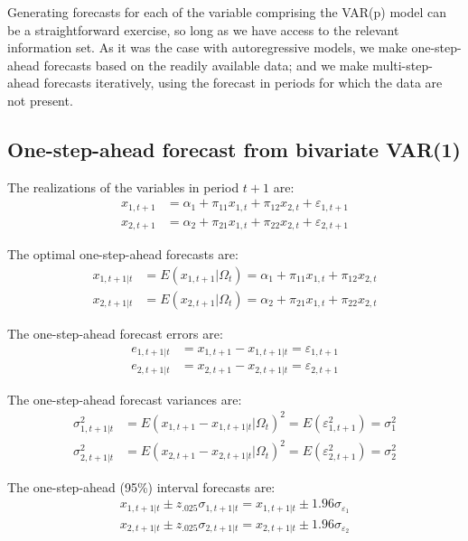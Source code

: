 \documentclass[
  oneside]{book}
\begin{document}
Generating forecasts for each of the variable comprising the VAR(p) model can be a straightforward exercise, so long as we have access to the relevant information set. As it was the case with autoregressive models, we make one-step-ahead forecasts based on the readily available data; and we make multi-step-ahead forecasts iteratively, using the forecast in periods for which the data are not present.

\hypertarget{one-step-ahead-forecast-from-bivariate-var1}{%
\subsection{One-step-ahead forecast from bivariate VAR(1)}\label{one-step-ahead-forecast-from-bivariate-var1}}

The realizations of the variables in period \(t+1\) are:
\[\begin{aligned}
x_{1,t+1} &= \alpha_1 + \pi_{11} x_{1,t} + \pi_{12} x_{2,t} + \varepsilon_{1,t+1} \\
x_{2,t+1} &= \alpha_2 + \pi_{21} x_{1,t} + \pi_{22} x_{2,t} + \varepsilon_{2,t+1}
\end{aligned}\]

The optimal one-step-ahead forecasts are:
\[\begin{aligned}
x_{1,t+1|t} &= E(x_{1,t+1}|\Omega_t) = \alpha_1 + \pi_{11} x_{1,t} + \pi_{12} x_{2,t} \\
x_{2,t+1|t} &= E(x_{2,t+1}|\Omega_t) = \alpha_2 + \pi_{21} x_{1,t} + \pi_{22} x_{2,t}
\end{aligned}\]

The one-step-ahead forecast errors are:
\[\begin{aligned}
e_{1,t+1|t} &= x_{1,t+1} - x_{1,t+1|t} = \varepsilon_{1,t+1} \\
e_{2,t+1|t} &= x_{2,t+1} - x_{2,t+1|t} = \varepsilon_{2,t+1}
\end{aligned}\]

The one-step-ahead forecast variances are:
\[\begin{aligned}
\sigma_{1,t+1|t}^2 &= E(x_{1,t+1} - x_{1,t+1|t}|\Omega_t)^2 = E(\varepsilon_{1,t+1}^2) = \sigma_{1}^2 \\
\sigma_{2,t+1|t}^2 &= E(x_{2,t+1} - x_{2,t+1|t}|\Omega_t)^2 = E(\varepsilon_{2,t+1}^2) = \sigma_{2}^2
\end{aligned}\]

The one-step-ahead (95\%) interval forecasts are:
\[\begin{aligned}
x_{1,t+1|t} \pm z_{.025}\sigma_{1,t+1|t} = x_{1,t+1|t} \pm 1.96\sigma_{\varepsilon_1} \\
x_{2,t+1|t} \pm z_{.025}\sigma_{2,t+1|t} = x_{2,t+1|t} \pm 1.96\sigma_{\varepsilon_2}
\end{aligned}\]
\end{document}
